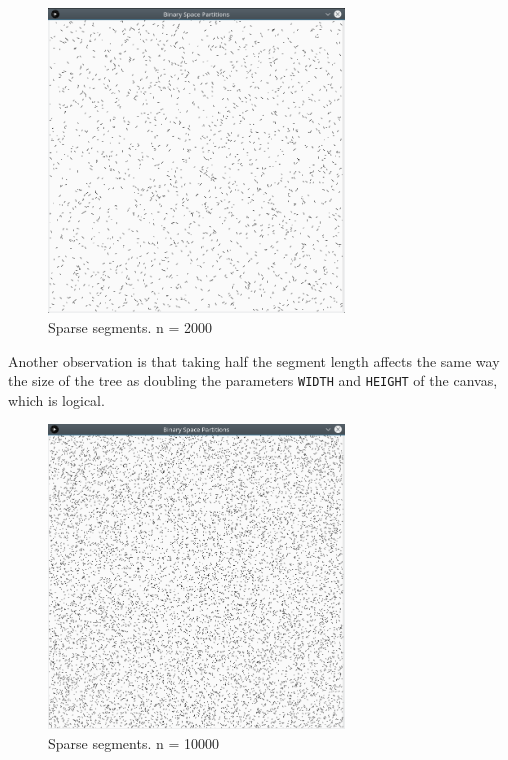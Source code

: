 \documentclass[12pt,a4paper]{article}
\begin{document}
\begin{figure}[ht!]
  \centering
  \includegraphics[width=0.7\textwidth]{img/sparse-input.png}
  \caption{Sparse segments. n = 2000}
  \label{fig:sparse-input}
\end{figure}

Another observation is that taking half the segment length affects the
same way the size of the tree as doubling the parameters
\texttt{WIDTH} and \texttt{HEIGHT} of the canvas, which is logical.


\begin{figure}[ht!]
  \centering
  \includegraphics[width=0.7\textwidth]{img/sparse-input10000.png}
  \caption{Sparse segments. n = 10000}
  \label{fig:sparse-input2}
\end{figure}
\end{document}
